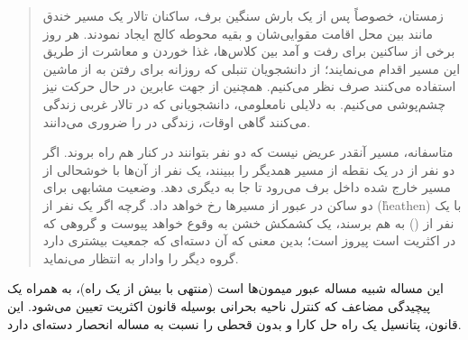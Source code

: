 \documentclass{book}
\begin{document}
\begin{quote}
    زمستان، خصوصاً پس از یک بارش سنگین برف، ساکنان تالار   یک مسیر خندق مانند بین محل اقامت مقوایی‌شان  و بقیه محوطه کالج 
    ایجاد نمودند. هر روز برخی از ساکنین  برای رفت و آمد بین کلاس‌ها، غذا خوردن و معاشرت از طریق این مسیر اقدام می‌نمایند؛ از دانشجویان 
    تنبلی که روزانه  برای رفتن به    از ماشین استفاده می‌کنند صرف نظر می‌کنیم. همچنین از جهت عابرین در حال حرکت نیز چشم‌پوشی می‌کنیم. 
    به دلایلی نامعلومی، دانشجویانی که در تالار غربی زندگی می‌کنند گاهی اوقات، زندگی در  را ضروری می‌دانند. 
    

    متاسفانه، مسیر آنقدر عریض نیست که دو نفر بتوانند در کنار هم راه بروند. اگر دو نفر از  در یک نقطه از مسیر همدیگر را ببینند، 
    یک نفر از آن‌ها با خوشحالی از مسیر خارج شده داخل برف می‌رود تا جا به دیگری دهد. وضعیت مشابهی برای دو ساکن 
    در عبور از مسیر‌ها رخ خواهد داد. گرچه اگر یک نفر از  (\r{heathen}) 
    با یک نفر از   () به هم برسند، یک کشمکش خشن 
    به وقوع خواهد پیوست  و گروهی که در اکثریت است پیروز است؛ بدین معنی که آن دسته‌ای که جمعیت بیشتری دارد گروه دیگر را 
    وادار به انتظار می‌نماید. 
\end{quote}

    این مساله شبیه مساله عبور میمون‌ها است (منتهی با بیش از یک راه)، به همراه یک پیچیدگی مضاعف
     که کنترل ناحیه بحرانی بوسیله قانون اکثریت تعیین می‌شود. این قانون، پتانسیل یک راه حل کارا و بدون قحطی را نسبت به مساله 
     انحصار دسته‌ای دارد. 
\end{document}
